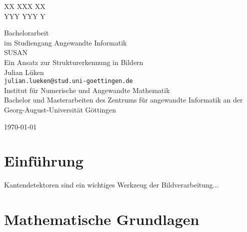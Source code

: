 \documentclass[a4paper, 11pt]{report}
\newcommand{\mytitle}{\LARGE}
\newcommand{\titlespace}{\vspace{6em}}
\theoremstyle{definition}
\newenvironment{myAbstract}{\section*{Abstract}}{}
\begin{document}
\begin{titlepage}
	\begin{center}
		\begin{minipage}{.49\textwidth}
			\flushleft
			
		\end{minipage}
		\begin{minipage}{.49\textwidth}
			\flushright
			XX XXX XX\\
			YYY YYY Y
		\end{minipage}
		\begin{minipage}{.5\textwidth}
			\begin{center}
				\vspace{2cm}
				\mytitle 		{Bachelorarbeit}\\
				\normalsize 	im Studiengang \glqq Angewandte Informatik\grqq\\
				\titlespace
				\mytitle 		{SUSAN}\\
				\normalsize 	Ein Ansatz zur Strukturerkennung in Bildern\\
				
				\titlespace		Julian Lüken\\
								\texttt{julian.lueken@stud.uni-goettingen.de}\\
				\titlespace		Institut für Numerische und Angewandte Mathematik\\
				\titlespace		Bachelor und Masterarbeiten des Zentrums für angewandte Informatik an der Georg-August-Universität Göttingen
				
				\titlespace		\today
			\end{center}
		\end{minipage}
	\end{center}
\end{titlepage}

\restoregeometry
{}
\pagestyle{empty}


\tableofcontents
\pagebreak
\restoregeometry
\pagestyle{headings}

\chapter{Einführung}
	Kantendetektoren sind ein wichtiges Werkzeug der Bildverarbeitung...

\chapter{Mathematische Grundlagen}
\end{document}
